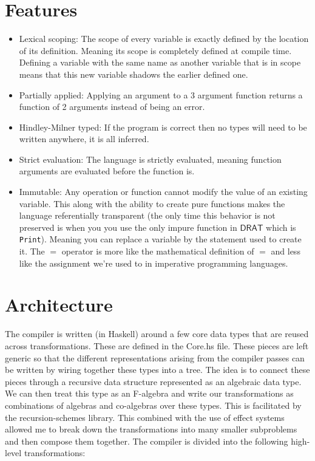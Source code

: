 \documentclass{article} %
\newcommand{\DRAT}{\mathsf{DRAT}}
\begin{document}
\section {Features}
    \begin{itemize}
        \item Lexical scoping: The scope of every variable is exactly defined by the location of its definition. Meaning its scope is completely defined at compile time. Defining a variable with the same name as another variable that is in scope means that this new variable shadows the earlier defined one.
        \item Partially applied: Applying an argument to a 3 argument function returns a function of 2 arguments instead of being an error.
        \item Hindley-Milner typed: If the program is correct then no types will need to be written anywhere, it is all inferred.
        \item Strict evaluation: The language is strictly evaluated, meaning function arguments are evaluated before the function is.
        \item Immutable: Any operation or function cannot modify the value of an existing variable. This along with the ability to create pure functions makes the language referentially transparent (the only time this behavior is not preserved is when you you use the only impure function in $\DRAT$ which is \texttt{Print}). Meaning you can replace a variable by the statement used to create it. The $=$ operator is more like the mathematical definition of $=$ and less like the assignment we're used to in imperative programming languages.
    \end{itemize}
\section {Architecture}
    The compiler is written (in Haskell) around a few core data types that are reused across transformations. These are defined in the Core.hs file. These pieces are left generic so that the different representations arising from the compiler passes can be written by wiring together these types into a tree. The idea is to connect these pieces through a recursive data structure represented as an algebraic data type. We can then treat this type as an F-algebra and write our transformations as combinations of algebras and co-algebras over these types. This is facilitated by the recursion-schemes library. This combined with the use of effect systems allowed me to break down the transformations into many smaller subproblems and then compose them together.
    The compiler is divided into the following high-level transformations:
\end{document}
